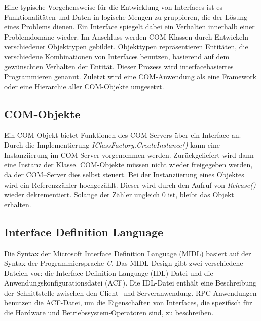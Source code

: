 Eine typische Vorgehensweise für die Entwicklung von Interfaces ist es Funktionalitäten und Daten in logische Mengen zu gruppieren, die der Lösung eines Problems dienen. Ein Interface spiegelt dabei ein Verhalten innerhalb einer Problemdomäne wieder. Im Anschluss werden COM-Klassen durch Entwickeln verschiedener Objekttypen gebildet. Objekttypen repräsentieren Entitäten, die verschiedene Kombinationen von Interfaces benutzen, basierend auf dem gewünschten Verhalten der Entität. Dieser Prozess wird interfacebasiertes Programmieren genannt. Zuletzt wird eine COM-Anwendung als eine Framework oder eine Hierarchie aller COM-Objekte umgesetzt.

\subsection{COM-Objekte}
\label{ch:grundlagen:sec:ComponentObjectModel:subsec:COMObjekte}

Ein COM-Objekt bietet Funktionen des COM-Servers über ein Interface an. Durch die Implementierung \textit{IClassFactory.CreateInstance()} kann eine Instanziierung im COM-Server vorgenommen werden. Zurückgeliefert wird dann eine Instanz der Klasse. COM-Objekte müssen nicht wieder freigegeben werden, da der COM–Server dies selbst steuert. Bei der Instanziierung eines Objektes  wird ein Referenzzähler hochgezählt. Dieser wird durch den Aufruf von \textit{Release()} wieder dekrementiert. Solange der Zähler ungleich 0 ist, bleibt das Objekt erhalten. 

\subsection{Interface Definition Language}
\label{ch:grundlagen:sec:ComponentObjectModel:subsec:InterfaceDefinitionLanguage}

Die Syntax der Microsoft Interface Definition Language (MIDL) basiert auf der Syntax der Programmiersprache \textit{C}. Das MIDL-Design gibt zwei verschiedene Dateien vor: die Interface Definition Language (IDL)-Datei und die Anwendungskonfigurationsdatei (ACF). Die IDL-Datei enthält eine Beschreibung der Schnittstelle zwischen den Client- und Serveranwendung. RPC Anwendungen benutzen die ACF-Datei, um die Eigenschaften von Interfaces, die spezifisch für die Hardware und Betriebssystem-Operatoren sind, zu beschreiben.